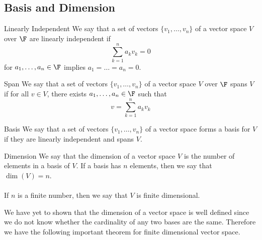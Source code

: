 \subsection{Basis and Dimension}
\begin{defn}{Linearly Independent}{} We say that a set of vectors $\{v_1,\dots,v_n\}$ of a vector space $V$ over $\F$ are linearly independent if $$\sum_{k=1}^na_kv_k=0$$ for $a_1,\dots,a_n\in\F$ implies $a_1=\dots=a_n=0$. 
\end{defn}

\begin{defn}{Span}{} We say that a set of vectors $\{v_1,\dots,v_n\}$ of a vector space $V$ over $\F$ spans $V$ if for all $v\in V$, there exists $a_1,\dots,a_n\in\F$ such that $$v=\sum_{k=1}^na_kv_k$$
\end{defn}

\begin{defn}{Basis}{} We say that a set of vectors $\{v_1,\dots,v_n\}$ of a vector space forms a basis for $V$ if they are linearly independent and spans $V$. 
\end{defn}

\begin{defn}{Dimension}{} We say that the dimension of a vector space $V$ is the number of elements in a basis of $V$. If a basis has $n$ elements, then we say that $\dim(V)=n$. \\~\\
If $n$ is a finite number, then we say that $V$ is finite dimensional. 
\end{defn}

We have yet to shown that the dimension of a vector space is well defined since we do not know whether the cardinality of any two bases are the same. Therefore we have the following important theorem for finite dimensional vector space. 

